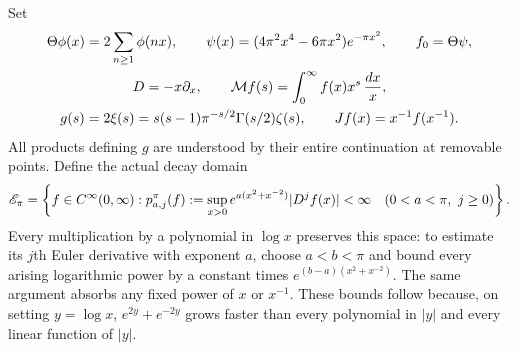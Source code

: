 \documentclass[11pt]{article}
\begin{document}
Set
\begin{equation}\label{hdt:eq:objects}
\begin{gathered}
\Theta\phi(x)=2\sum_{n\geq1}\phi(nx),\qquad
\psi(x)=(4\pi^2x^4-6\pi x^2)e^{-\pi x^2},\qquad f_0=\Theta\psi,\\
D=-x\partial_x,\qquad
\mathcal M f(s)=\int_0^\infty f(x)x^s\,\frac{dx}{x},\\
g(s)=2\xi(s)=s(s-1)\pi^{-s/2}\Gamma(s/2)\zeta(s),\qquad
Jf(x)=x^{-1}f(x^{-1}).
\end{gathered}
\end{equation}
All products defining $g$ are understood by their entire continuation
at removable points. Define the actual decay domain
\begin{equation}\label{hdt:eq:Epi}
\mathscr E_\pi=\left\{f\in C^\infty(0,\infty):
p_{a,j}^{\pi}(f):=\sup_{x>0}e^{a(x^2+x^{-2})}|D^jf(x)|<\infty
\quad(0<a<\pi,\ j\geq0)\right\}.
\end{equation}
Every multiplication by a polynomial in $\log x$ preserves this
space: to estimate its $j$th Euler derivative with exponent $a$, choose
$a<b<\pi$ and bound every arising logarithmic power by a constant
times $e^{(b-a)(x^2+x^{-2})}$. The same argument absorbs any fixed
power of $x$ or $x^{-1}$. These bounds follow because, on setting
$y=\log x$, $e^{2y}+e^{-2y}$ grows faster than every polynomial in
$|y|$ and every linear function of $|y|$.
\end{document}
